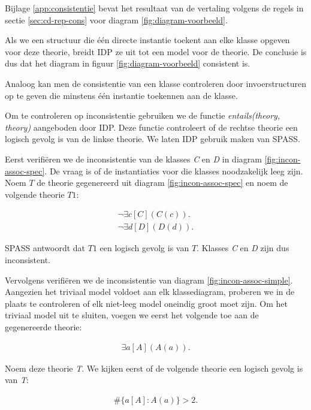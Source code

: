 Bijlage \ref{app:consistentie} bevat het resultaat van de vertaling volgens de regels in sectie \ref{sec:cd-rep-cons} voor diagram \ref{fig:diagram-voorbeeld}.

Als we een structuur die \'e\'en directe instantie toekent aan elke klasse opgeven voor deze theorie, breidt IDP ze uit tot een model voor de theorie. De conclusie is dus dat het diagram in figuur \ref{fig:diagram-voorbeeld} consistent is.

Analoog kan men de consistentie van een klasse controleren door invoerstructuren op te geven die minstens \'e\'en instantie toekennen aan de klasse.

Om te controleren op inconsistentie gebruiken we de functie \textit{entails(theory, theory)} aangeboden door IDP\cite{DeCatBroes2014PLaa}. Deze functie controleert of de rechtse theorie een logisch gevolg is van de linkse theorie. We laten IDP gebruik maken van SPASS\cite{SPASS}.

Eerst verifi\"eren we de inconsistentie van de klasses \textit{C} en \textit{D} in diagram \ref{fig:incon-assoc-spec}. De vraag is of de instantiaties voor die klasses noodzakelijk leeg zijn. Noem $T$ de theorie gegenereerd uit diagram \ref{fig:incon-assoc-spec} en noem de volgende theorie $T1$:

\begin{align*}
	\lnot{}\exists{c}[C](C(c)). \\
	\lnot{}\exists{d}[D](D(d)).
\end{align*}

SPASS antwoordt dat $T1$ een logisch gevolg is van $T$. Klasses \textit{C} en \textit{D} zijn dus inconsistent.

Vervolgens verifi\"eren we de inconsistentie van diagram \ref{fig:incon-assoc-simple}. Aangezien het triviaal model voldoet aan elk klassediagram, proberen we in de plaats te controleren of elk niet-leeg model oneindig groot moet zijn. Om het triviaal model uit te sluiten, voegen we eerst het volgende toe aan de gegenereerde theorie:

\begin{align*}
	\exists{a}[A](A(a)).
\end{align*}

Noem deze theorie \textit{T}. We kijken eerst of de volgende theorie een logisch gevolg is van \textit{T}:

\begin{align*}
	\#\{a [A] : A(a)\} > 2.
\end{align*}

